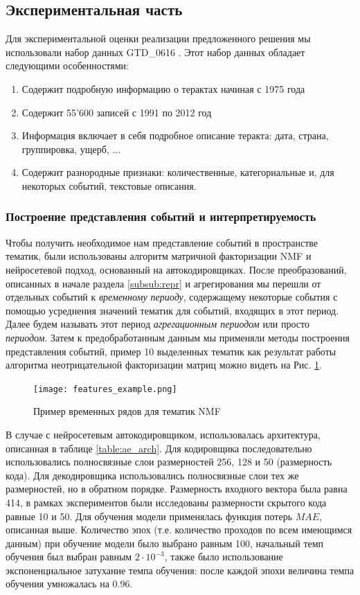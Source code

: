 
\subsection{Экспериментальная часть}
Для экспериментальной оценки реализации предложенного решения мы использовали набор данных GTD\_0616 \cite{db:gtd}.
Этот набор данных обладает следующими особенностями:
	\begin{enumerate}
		\item Содержит подробную информацию о терактах начиная с 1975 года
		\item Содержит 55'600 записей с 1991 по 2012 год
        \item Информация включает в себя подробное описание теракта: дата, страна, группировка, ущерб, ...
        \item Содержит разнородные признаки: количественные, категориальные и, для некоторых событий, текстовые описания.
	\end{enumerate}

\subsubsection{Построение представления событий и интерпретируемость}
Чтобы получить необходимое нам представление событий в пространстве тематик, были использованы алгоритм матричной факторизации NMF и нейросетевой подход, основанный на автокодировщиках.
После преобразований, описанных в начале раздела \ref{subsub:repr} и агрегирования мы перешли от отдельных событий к \textit{временному периоду}, содержащему некоторые события с помощью усреднения значений тематик для событий, входящих в этот период. Далее будем называть этот период \textit{агрегационным периодом} или просто \textit{периодом}. Затем к предобработанным данным мы применяли методы построения представления событий, пример 10 выделенных тематик как результат работы алгоритма неотрицательной факторизации матриц можно видеть на  Рис. \ref{fig:features_example}.

\begin{figure}
  \texttt{[image: features\_example.png]}
  \caption{Пример временных рядов для тематик NMF}
  \label{fig:features_example}
\end{figure}

В случае с нейросетевым автокодировщиком, использовалась архитектура, описанная в таблице \ref{table:ae_arch}. Для кодировщика последовательно использовались полносвязные слои размерностей 256, 128 и 50 (размерность кода). Для декодировщика использовались полносвязные слои тех же размерностей, но в обратном порядке. Размерность входного вектора была равна 414, в рамках экспериментов были исследованы размерности скрытого кода равные 10 и 50. Для обучения модели применялась функция потерь $MAE$, описанная выше.
Количество эпох (т.е. количество проходов по всем имеющимся данным) при обучение модели было выбрано равным 100, начальный темп обучения был выбран равным  $2\cdot 10^{-3}$, также было использование экспоненциальное затухание темпа обучения: после каждой эпохи величина темпа обучения умножалась на 0.96.

